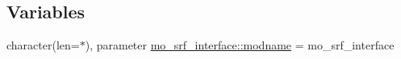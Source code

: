 \subsection*{Variables}
\begin{DoxyCompactItemize}
\item 
character(len=$\ast$), parameter \hyperlink{namespacemo__srf__interface_ad2ac37413e10df5be378325501189b54}{mo\+\_\+srf\+\_\+interface\+::modname} = \textquotesingle{}mo\+\_\+srf\+\_\+interface\textquotesingle{}
\end{DoxyCompactItemize}
